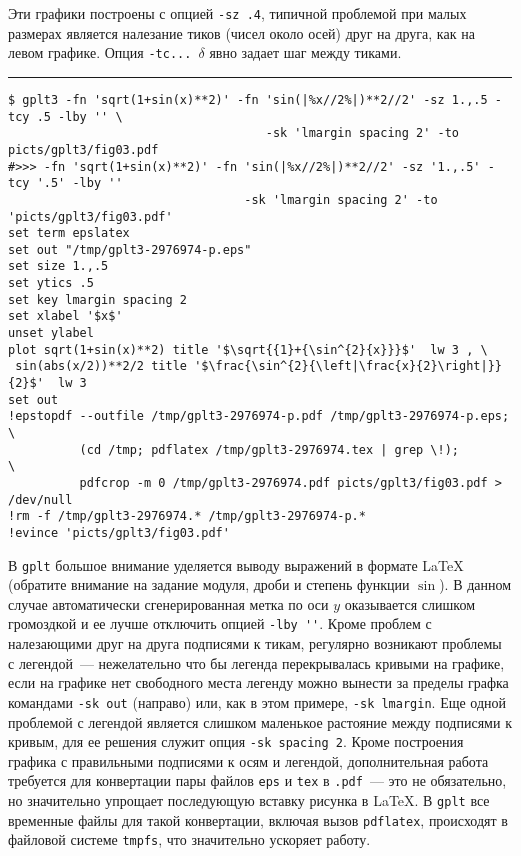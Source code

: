 \documentclass[12pt]{article}
\def\gplt{{\tt gplt}}
\def\pdf{{\tt .pdf}}
\begin{document}
Эти графики построены с опцией \verb'-sz .4', типичной проблемой при малых размерах является налезание тиков (чисел около осей) друг на друга, как на левом графике.
Опция \verb'-tc... '$\delta$ явно задает шаг между тиками.\\

\hrule %

\vspace{3mm}
{\small
\begin{verbatim}
$ gplt3 -fn 'sqrt(1+sin(x)**2)' -fn 'sin(|%x//2%|)**2//2' -sz 1.,.5 -tcy .5 -lby '' \
                                    -sk 'lmargin spacing 2' -to picts/gplt3/fig03.pdf
#>>> -fn 'sqrt(1+sin(x)**2)' -fn 'sin(|%x//2%|)**2//2' -sz '1.,.5' -tcy '.5' -lby '' 
                                 -sk 'lmargin spacing 2' -to 'picts/gplt3/fig03.pdf'
set term epslatex 
set out "/tmp/gplt3-2976974-p.eps"
set size 1.,.5
set ytics .5
set key lmargin spacing 2
set xlabel '$x$'
unset ylabel
plot sqrt(1+sin(x)**2) title '$\sqrt{{1}+{\sin^{2}{x}}}$'  lw 3 , \
 sin(abs(x/2))**2/2 title '$\frac{\sin^{2}{\left|\frac{x}{2}\right|}}{2}$'  lw 3 
set out
!epstopdf --outfile /tmp/gplt3-2976974-p.pdf /tmp/gplt3-2976974-p.eps;        \
          (cd /tmp; pdflatex /tmp/gplt3-2976974.tex | grep \!);               \
          pdfcrop -m 0 /tmp/gplt3-2976974.pdf picts/gplt3/fig03.pdf > /dev/null
!rm -f /tmp/gplt3-2976974.* /tmp/gplt3-2976974-p.*
!evince 'picts/gplt3/fig03.pdf'
\end{verbatim}
  }
\begin{center}
\end{center}
В \gplt{} большое внимание уделяется выводу выражений в формате \LaTeX{} (обратите внимание на задание модуля, дроби и степень функции $\sin$).
В данном случае автоматически сгенерированная метка по оси $y$ оказывается слишком громоздкой и ее лучше отключить опцией \verb|-lby ''|.
Кроме проблем с налезающими друг на друга подписями к тикам, регулярно возникают проблемы с легендой~--- нежелательно что бы легенда
перекрывалась кривыми на графике, если на графике нет свободного места легенду можно вынести за пределы графка командами \verb'-sk out' (направо)
или, как в этом примере, \verb'-sk lmargin'. Еще одной проблемой с легендой является слишком маленькое растояние между подписями к кривым,
для ее решения служит опция \verb'-sk spacing 2'. Кроме построения графика с правильными подписями к осям и легендой, дополнительная работа
требуется для конвертации пары файлов \verb'eps' и \verb'tex' в \pdf~--- это не обязательно, но значительно упрощает последующую вставку рисунка
в \LaTeX. В \gplt{} все временные файлы для такой конвертации, включая вызов \verb'pdflatex', происходят в файловой системе \verb'tmpfs',
что значительно ускоряет работу.\\
\end{document}
